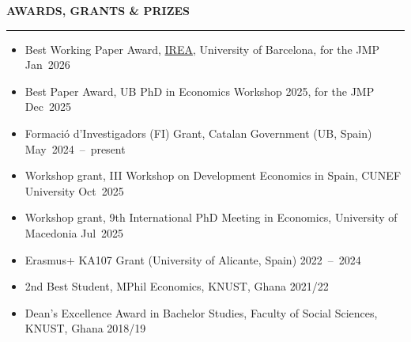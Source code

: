 \documentclass{resume} %
\def\sectionskip{\vspace{4pt}}
\def\sectionlineskip{\smallskip}
\renewenvironment{rSection}[1]{%
  \sectionskip
  \MakeUppercase{{\bf #1}}%
  \sectionlineskip
  \hrule
  \begin{list}{}{\setlength{\leftmargin}{0em}\setlength{\topsep}{5pt}\setlength{\itemsep}{0pt}\setlength{\parsep}{0pt}}%
  \item[]
}{%
  \end{list}
}
\newcommand{\when}[1]{\hfill\mbox{#1}}
\begin{document}
\begin{rSection}{Awards, Grants \& Prizes}
\begin{itemize}
\item Best Working Paper Award, \href{https://www.ub.edu/irea/}{IREA}, University of Barcelona, for the JMP \when{Jan 2026}
\item Best Paper Award, UB PhD in Economics Workshop 2025, for the JMP \when{Dec 2025}
\item Formació d'Investigadors (FI) Grant, Catalan Government (UB, Spain) \when{May 2024 -- present}
\item Workshop grant, III Workshop on Development Economics in Spain, CUNEF University \when{Oct 2025}
\item Workshop grant, 9th International PhD Meeting in Economics, University of Macedonia \when{Jul 2025}
\item Erasmus+ KA107 Grant (University of Alicante, Spain) \when{2022 -- 2024}
\item 2nd Best Student, MPhil Economics, KNUST, Ghana \when{2021/22}
\item Dean’s Excellence Award in Bachelor Studies, Faculty of Social Sciences, KNUST, Ghana \when{2018/19}
\end{itemize}
\end{rSection}
\end{document}
